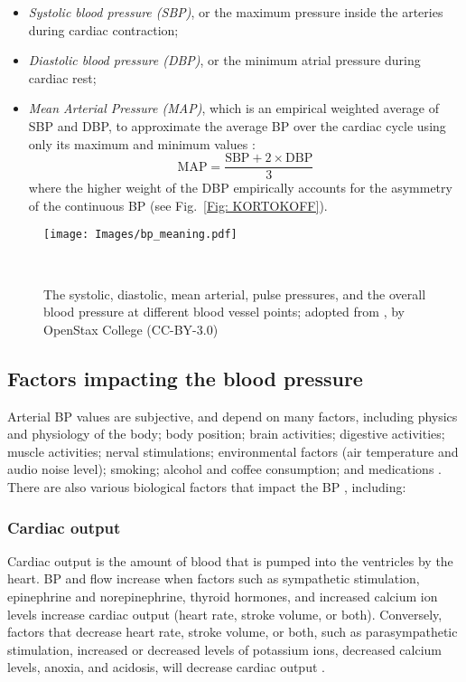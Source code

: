 \documentclass[journal,article,moreauthors]{Definitions/mdpi}
\begin{document}
\begin{itemize}
\item\textit{Systolic blood pressure (SBP)}, or the maximum pressure inside the arteries during cardiac contraction;
\item\textit{Diastolic blood pressure (DBP)}, or the minimum atrial pressure during cardiac rest;
\item\textit{Mean Arterial Pressure (MAP)}, which is an empirical weighted average of SBP and DBP, to approximate the average BP over the cardiac cycle using only its maximum and minimum values \citep{Vlachopoulos2011-kp}:
\begin{equation}
\text{MAP}=\frac{\text{SBP}+2\times\text{DBP}}{3}
\label{Eq: Map}
\end{equation}
where the higher weight of the DBP empirically accounts for the asymmetry of the continuous BP (see Fig.~\ref{Fig: KORTOKOFF}).
\end{itemize}

\begin{figure}[tb]
\centering
\texttt{[image: Images/bp\_meaning.pdf]}
\caption{The systolic, diastolic, mean arterial, pulse pressures, and the overall blood pressure at different blood vessel points; adopted from \citep{bettsanatomy}, by OpenStax College (CC-BY-3.0)}‌\label{Fig: BP_meaning}
\end{figure}

\subsection{Factors impacting the blood pressure}
  
Arterial BP values are subjective, and depend on many factors, including physics and physiology of the body; body position; brain activities; digestive activities; muscle activities; nerval stimulations; environmental factors (air temperature and audio noise level); smoking; alcohol and coffee consumption; and medications \citep{M10, M1}. There are also various biological factors that impact the BP \citep{desaix2013anatomy}, including:
\subsubsection{Cardiac output} Cardiac output is the amount of blood that is pumped into the ventricles by the heart. BP and flow increase when factors such as sympathetic stimulation, epinephrine and norepinephrine, thyroid hormones, and increased calcium ion levels increase cardiac output (heart rate, stroke volume, or both). Conversely, factors that decrease heart rate, stroke volume, or both, such as parasympathetic stimulation, increased or decreased levels of potassium ions, decreased calcium levels, anoxia, and acidosis, will decrease cardiac output \citep{desaix2013anatomy, M10}.
\end{document}
